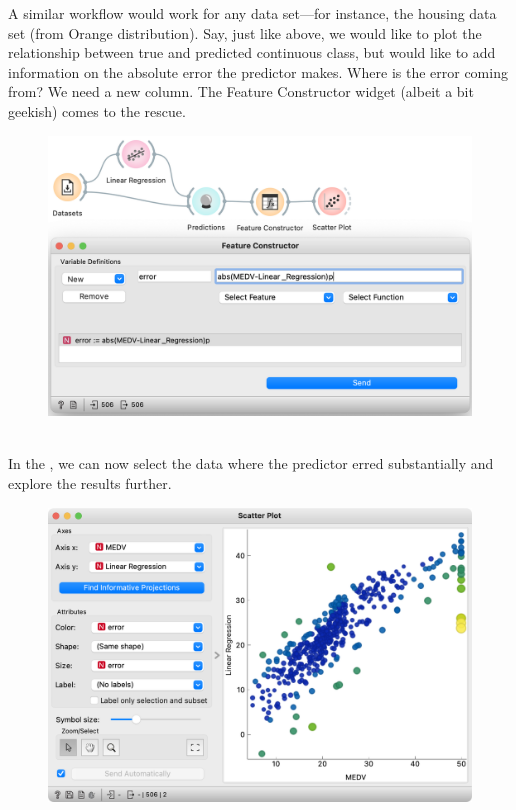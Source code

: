 A similar workflow would work for any data set—for instance, the housing data set (from Orange distribution). Say, just like above, we would like to plot the relationship between true and predicted continuous class, but would like to add information on the absolute error the predictor makes. Where is the error coming from? We need a new column. The Feature Constructor widget (albeit a bit geekish) comes to the rescue.

\begin{figure}[h]
    \centering
    \includegraphics[scale=0.4]{feature-constructor.png}
    \caption{$\;$}
\end{figure}

In the , we can now select the data where the predictor erred substantially and explore the results further. 


\begin{figure}[h]
    \centering
    \includegraphics[scale=0.4]{scatterplot.png}
    \caption{$\;$}
\end{figure}